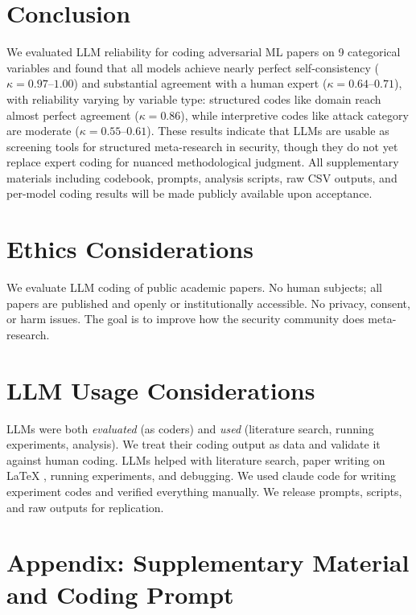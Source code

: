 \documentclass[conference,compsoc]{IEEEtran}
\begin{document}
\section{Conclusion}

We evaluated LLM reliability for coding adversarial ML papers on 9 categorical variables and found that all models achieve nearly perfect self-consistency ($\kappa = 0.97$--$1.00$) and substantial agreement with a human expert ($\kappa = 0.64$--$0.71$), with reliability varying by variable type: structured codes like domain reach almost perfect agreement ($\kappa = 0.86$), while interpretive codes like attack category are moderate ($\kappa = 0.55$--$0.61$). These results indicate that LLMs are usable as screening tools for structured meta-research in security, though they do not yet replace expert coding for nuanced methodological judgment. All supplementary materials including codebook, prompts, analysis scripts, raw CSV outputs, and per-model coding results will be made publicly available upon acceptance.

\section{Ethics Considerations}

We evaluate LLM coding of public academic papers. No human subjects; all papers are published and openly or institutionally accessible. No privacy, consent, or harm issues. The goal is to improve how the security community does meta-research.

\section{LLM Usage Considerations}

LLMs were both \emph{evaluated} (as coders) and \emph{used} (literature search, running experiments, analysis). We treat their coding output as data and validate it against human coding. LLMs helped with literature search, paper writing on LaTeX , running experiments, and debugging. We used claude code for writing experiment codes and verified everything manually. We release prompts, scripts, and raw outputs for replication.



\onecolumn
\appendix
\section*{Appendix: Supplementary Material and Coding Prompt}
\label{app:heatmaps}
\end{document}
